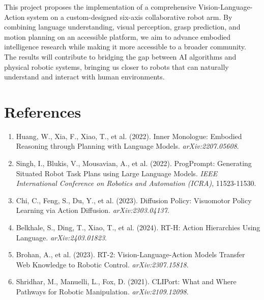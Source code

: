 \documentclass{article}
\begin{document}
This project proposes the implementation of a comprehensive Vision-Language-Action system on a custom-designed six-axis collaborative robot arm. By combining language understanding, visual perception, grasp prediction, and motion planning on an accessible platform, we aim to advance embodied intelligence research while making it more accessible to a broader community. The results will contribute to bridging the gap between AI algorithms and physical robotic systems, bringing us closer to robots that can naturally understand and interact with human environments.

\section*{References}

\begin{enumerate}
\item Huang, W., Xia, F., Xiao, T., et al. (2022). Inner Monologue: Embodied Reasoning through Planning with Language Models. \textit{arXiv:2207.05608}.

\item Singh, I., Blukis, V., Mousavian, A., et al. (2022). ProgPrompt: Generating Situated Robot Task Plans using Large Language Models. \textit{IEEE International Conference on Robotics and Automation (ICRA)}, 11523-11530.

\item Chi, C., Feng, S., Du, Y., et al. (2023). Diffusion Policy: Visuomotor Policy Learning via Action Diffusion. \textit{arXiv:2303.04137}.

\item Belkhale, S., Ding, T., Xiao, T., et al. (2024). RT-H: Action Hierarchies Using Language. \textit{arXiv:2403.01823}.

\item Brohan, A., et al. (2023). RT-2: Vision-Language-Action Models Transfer Web Knowledge to Robotic Control. \textit{arXiv:2307.15818}.

\item Shridhar, M., Manuelli, L., Fox, D. (2021). CLIPort: What and Where Pathways for Robotic Manipulation. \textit{arXiv:2109.12098}.
\end{enumerate}

\end{document}
